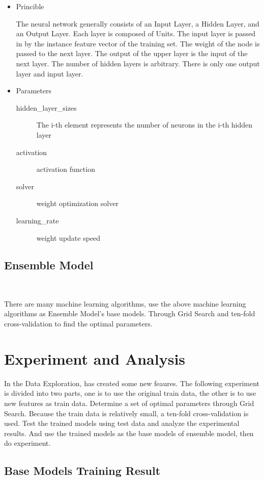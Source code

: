 \begin{itemize}
	\item Princible
	
	The neural network generally consists of 
	an Input Layer, a Hidden Layer, and an Output Layer. 
	Each layer is composed of Units. 
	The input layer is passed in by 
	the instance feature vector of the training set. 
	The weight of the node is passed to the next layer. 
	The output of the upper layer is 
	the input of the next layer. 
	The number of hidden layers is arbitrary. 
	There is only one output layer and input layer.
	
	\item Parameters
	
	\begin{description}
		\item[hidden_layer_sizes] The i-th element represents 
		the number of neurons in the i-th hidden layer
		\item[activation] activation function
		\item[solver] weight optimization solver
		\item[learning_rate] weight update speed
	\end{description}
\end{itemize}

\subsection{Ensemble Model}
\

There are many machine learning algorithms, 
use the above machine learning algorithms 
as Ensemble Model’s base models. 
Through Grid Search and
ten-fold cross-validation
to find the optimal parameters.

\section{Experiment and Analysis}

In the Data Exploration, 
has created some new feaures.
The following experiment is divided into two parts,
one is to use the original train data, 
the other is to use new features as train data.
Determine a set of optimal parameters 
through Grid Search. 
Because the train data is relatively small, 
a ten-fold cross-validation is used. 
Test the trained models using test data and 
analyze the experimental results.
And use the trained models as 
the base models of ensemble model,
then do experiment. 

\subsection{Base Models Training Result}
